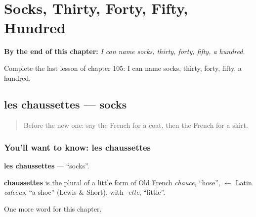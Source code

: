
\chapter{Socks, Thirty, Forty, Fifty, Hundred}
\label{ch:fr-socks-thirty-forty-fifty-hundred}

\begin{chapteropening}
\textbf{By the end of this chapter:} \emph{I can name socks, thirty, forty, fifty, a hundred.}

Complete the last lesson of chapter 105: I can name socks, thirty, forty, fifty, a hundred.
\end{chapteropening}

\section[les chaussettes]{les chaussettes — socks}

\label{lesson:FR-C105-chaussettes}



\begin{quote}
Before the new one: say the French for a coat, then the French for a skirt.
\end{quote}

\subsection*{You'll want to know: les chaussettes}
\textbf{les chaussettes} — \textquotedblleft{}socks\textquotedblright{}.

\begin{cousinweb}
\textbf{chaussettes} is the plural of a little form of Old French \emph{chauce}, \textquotedblleft{}hose\textquotedblright{}, $\leftarrow$ Latin \emph{calceus}, \textquotedblleft{}a shoe\textquotedblright{} (Lewis \& Short), with \emph{-ette}, \textquotedblleft{}little\textquotedblright{}.
\end{cousinweb}

\begin{grammarlens}[title={What you've built}]
One more word for this chapter.
\end{grammarlens}

